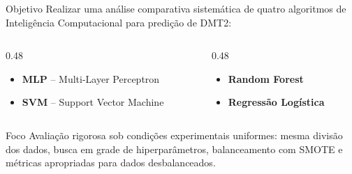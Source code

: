 \documentclass[10pt]{beamer}
\begin{document}
\begin{frame}{Objetivo}
    Realizar uma análise comparativa sistemática de quatro algoritmos de Inteligência Computacional para predição de DMT2:
    \vspace{0.3cm}
    \begin{columns}
        \begin{column}{0.48\textwidth}
            \begin{itemize}
                \item \textbf{MLP} -- Multi-Layer Perceptron
                \item \textbf{SVM} -- Support Vector Machine
            \end{itemize}
        \end{column}
        \begin{column}{0.48\textwidth}
            \begin{itemize}
                \item \textbf{Random Forest}
                \item \textbf{Regressão Logística}
            \end{itemize}
        \end{column}
    \end{columns}
    \vspace{0.4cm}
    \begin{alertblock}{Foco}
        Avaliação rigorosa sob condições experimentais uniformes: mesma divisão dos dados, busca em grade de hiperparâmetros, balanceamento com SMOTE e métricas apropriadas para dados desbalanceados.
    \end{alertblock}
\end{frame}

\end{document}
